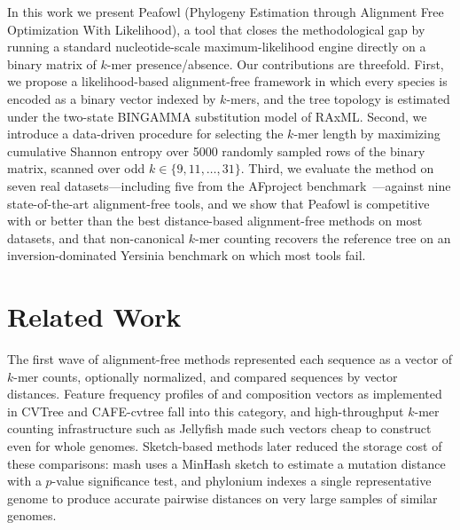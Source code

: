 \documentclass[11pt]{article}
\begin{document}
In this work we present Peafowl (Phylogeny Estimation through Alignment Free
Optimization With Likelihood), a tool that closes the methodological gap by
running a standard nucleotide-scale maximum-likelihood engine
\citep{stamatakis2014raxml} directly on a binary matrix of $k$-mer
presence/absence. Our contributions are threefold. First, we propose a
likelihood-based alignment-free framework in which every species is encoded as
a binary vector indexed by $k$-mers, and the tree topology is estimated under
the two-state BINGAMMA substitution model of RAxML. Second, we introduce a
data-driven procedure for selecting the $k$-mer length by maximizing
cumulative Shannon entropy \citep{shannon1948mathematical} over 5000 randomly
sampled rows of the binary matrix, scanned over odd
$k \in \{9, 11, \ldots, 31\}$. Third, we evaluate the method on seven real
datasets---including five from the AFproject
benchmark~\citep{zielezinski2019afproject}---against nine state-of-the-art
alignment-free tools, and we show that Peafowl is competitive with or better
than the best distance-based alignment-free methods on most datasets, and
that non-canonical $k$-mer counting recovers the reference tree on an
inversion-dominated Yersinia benchmark on which most tools fail.

\section{Related Work}

The first wave of alignment-free methods represented each sequence as a vector
of $k$-mer counts, optionally normalized, and compared sequences by vector
distances. Feature frequency profiles of \citet{sims2009ffp} and composition
vectors as implemented in CVTree and CAFE-cvtree
\citep{gao2007cvtree, lu2017cafe} fall into this category, and
high-throughput $k$-mer counting infrastructure such as Jellyfish
\citep{marcais2011jellyfish} made such vectors cheap to construct even for
whole genomes. Sketch-based methods later reduced the storage cost of these
comparisons: mash \citep{ondov2016mash} uses a MinHash sketch to estimate a
mutation distance with a $p$-value significance test, and phylonium
\citep{klotzl2020phylonium} indexes a single representative genome to produce
accurate pairwise distances on very large samples of similar genomes.
\end{document}
